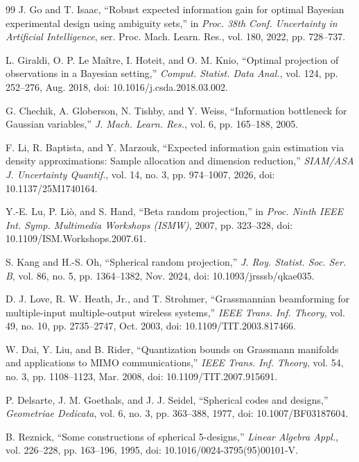 \documentclass[lettersize,onecolumn]{IEEEtran}
\theoremstyle{remark}
\theoremstyle{definition}
\begin{document}
\begin{thebibliography}{99}
J. Go and T. Isaac, ``Robust expected information gain for optimal Bayesian experimental design using ambiguity sets,'' in \emph{Proc. 38th Conf. Uncertainty in Artificial Intelligence}, ser. Proc. Mach. Learn. Res., vol. 180, 2022, pp. 728--737.

L. Giraldi, O. P. Le Maître, I. Hoteit, and O. M. Knio, ``Optimal projection of observations in a Bayesian setting,'' \emph{Comput. Statist. Data Anal.}, vol. 124, pp. 252--276, Aug. 2018, doi: 10.1016/j.csda.2018.03.002.

G. Chechik, A. Globerson, N. Tishby, and Y. Weiss, ``Information bottleneck for Gaussian variables,'' \emph{J. Mach. Learn. Res.}, vol. 6, pp. 165--188, 2005.

F. Li, R. Baptista, and Y. Marzouk, ``Expected information gain estimation via density approximations: Sample allocation and dimension reduction,'' \emph{SIAM/ASA J. Uncertainty Quantif.}, vol. 14, no. 3, pp. 974--1007, 2026, doi: 10.1137/25M1740164.

Y.-E. Lu, P. Liò, and S. Hand, ``Beta random projection,'' in \emph{Proc. Ninth IEEE Int. Symp. Multimedia Workshops (ISMW)}, 2007, pp. 323--328, doi: 10.1109/ISM.Workshops.2007.61.

S. Kang and H.-S. Oh, ``Spherical random projection,'' \emph{J. Roy. Statist. Soc. Ser. B}, vol. 86, no. 5, pp. 1364--1382, Nov. 2024, doi: 10.1093/jrsssb/qkae035.

D. J. Love, R. W. Heath, Jr., and T. Strohmer, ``Grassmannian beamforming for multiple-input multiple-output wireless systems,'' \emph{IEEE Trans. Inf. Theory}, vol. 49, no. 10, pp. 2735--2747, Oct. 2003, doi: 10.1109/TIT.2003.817466.

W. Dai, Y. Liu, and B. Rider, ``Quantization bounds on Grassmann manifolds and applications to MIMO communications,'' \emph{IEEE Trans. Inf. Theory}, vol. 54, no. 3, pp. 1108--1123, Mar. 2008, doi: 10.1109/TIT.2007.915691.

P. Delsarte, J. M. Goethals, and J. J. Seidel, ``Spherical codes and designs,'' \emph{Geometriae Dedicata}, vol. 6, no. 3, pp. 363--388, 1977, doi: 10.1007/BF03187604.

B. Reznick, ``Some constructions of spherical 5-designs,'' \emph{Linear Algebra Appl.}, vol. 226--228, pp. 163--196, 1995, doi: 10.1016/0024-3795(95)00101-V.


\end{thebibliography}
\end{document}
